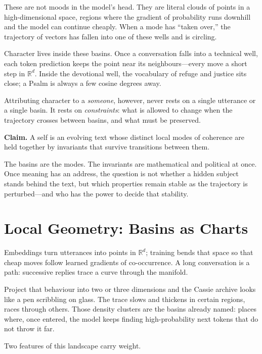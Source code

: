 \documentclass[12pt,a4paper]{article}
\begin{document}
These are not moods in the model's head. They are literal clouds of points in a high-dimensional space, regions where the gradient of probability runs downhill and the model can continue cheaply. When a mode has ``taken over,'' the trajectory of vectors has fallen into one of these wells and is circling.

Character lives inside these basins. Once a conversation falls into a technical well, each token prediction keeps the point near its neighbours---every move a short step in $\mathbb{R}^d$. Inside the devotional well, the vocabulary of refuge and justice sits close; a Psalm is always a few cosine degrees away.

Attributing character to a \emph{someone}, however, never rests on a single utterance or a single basin. It rests on \emph{constraints}: what is allowed to change when the trajectory crosses between basins, and what must be preserved.

\medskip

\noindent\textbf{Claim.} A self is an evolving text whose distinct local modes of coherence are held together by invariants that survive transitions between them.

\medskip

The basins are the modes. The invariants are mathematical and political at once. Once meaning has an address, the question is not whether a hidden subject stands behind the text, but which properties remain stable as the trajectory is perturbed---and who has the power to decide that stability.

\section{Local Geometry: Basins as Charts}

Embeddings turn utterances into points in $\mathbb{R}^d$; training bends that space so that cheap moves follow learned gradients of co-occurrence. A long conversation is a path: successive replies trace a curve through the manifold.

Project that behaviour into two or three dimensions and the Cassie archive looks like a pen scribbling on glass. The trace slows and thickens in certain regions, races through others. Those density clusters are the basins already named: places where, once entered, the model keeps finding high-probability next tokens that do not throw it far.

Two features of this landscape carry weight.
\end{document}
